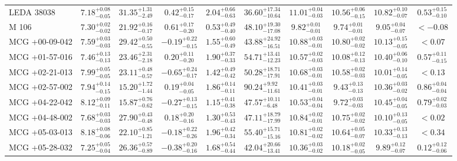 \documentclass[onecolumn]{mn2e}
\begin{document}
\begin{landscape}
{\begin{center}
\begin{longtable}{lccccccccc}
LEDA 38038 & $7.18_{-0.05}^{+0.08}$ & $31.35_{-2.49}^{+1.31}$ & $0.42_{-0.17}^{+0.15}$ & $2.04_{-0.63}^{+0.66}$ &$36.60_{-10.64}^{+17.34}$ & $11.01_{-0.03}^{+0.04}$ & $10.56_{-0.15}^{+0.06}$ & $10.82_{-0.07}^{+0.10}$ & $0.53_{-0.10}^{+0.15}$ \\
M 106 & $7.30_{-0.02}^{+0.02}$ & $21.92_{-0.17}^{+0.16}$ & $0.61_{-0.20}^{+0.17}$ & $0.53_{-0.40}^{+0.49}$ &$48.10_{-17.08}^{+19.30}$ & $9.82_{-0.01}^{+0.01}$ & $9.74_{-0.01}^{+0.01}$ & $9.05_{-0.07}^{+0.04}$ & $<-0.08$ \\
MCG +00-09-042 & $7.59_{-0.03}^{+0.03}$ & $29.42_{-0.55}^{+0.50}$ & $-0.19_{-0.15}^{+0.22}$ & $1.55_{-0.49}^{+0.60}$ &$43.88_{-16.51}^{+24.92}$ & $10.88_{-0.01}^{+0.03}$ & $10.80_{-0.02}^{+0.02}$ & $10.13_{-0.05}^{+0.15}$ & $<0.07$ \\
MCG +01-57-016 & $7.46_{-0.13}^{+0.13}$ & $23.46_{-2.18}^{+2.31}$ & $0.20_{-0.20}^{+0.11}$ & $1.90_{-0.33}^{+0.37}$ &$54.71_{-12.23}^{+13.41}$ & $10.57_{-0.03}^{+0.02}$ & $10.08_{-0.13}^{+0.12}$ & $10.40_{-0.10}^{+0.06}$ & $0.57_{-0.15}^{+0.11}$ \\
MCG +02-21-013 & $7.99_{-0.05}^{+0.05}$ & $23.11_{-0.57}^{+0.48}$ & $-0.65_{-0.17}^{+0.24}$ & $1.42_{-0.42}^{+0.49}$ &$50.28_{-17.91}^{+18.71}$ & $10.68_{-0.01}^{+0.03}$ & $10.58_{-0.03}^{+0.02}$ & $10.01_{-0.05}^{+0.14}$ & $<0.13$ \\
MCG +02-57-002 & $7.94_{-0.15}^{+0.14}$ & $15.20_{-1.44}^{+1.72}$ & $0.19_{-0.05}^{+0.04}$ & $1.86_{-0.11}^{+0.14}$ &$90.24_{-11.61}^{+9.92}$ & $10.41_{-0.01}^{+0.03}$ & $9.43_{-0.13}^{+0.13}$ & $10.36_{-0.02}^{+0.03}$ & $0.86_{-0.04}^{+0.04}$ \\
MCG +04-22-042 & $8.12_{-0.11}^{+0.09}$ & $15.87_{-0.62}^{+0.76}$ & $-0.27_{-0.15}^{+0.13}$ & $1.15_{-0.38}^{+0.41}$ &$47.57_{-6.48}^{+10.11}$ & $10.53_{-0.04}^{+0.04}$ & $9.72_{-0.03}^{+0.03}$ & $10.45_{-0.05}^{+0.04}$ & $0.79_{-0.03}^{+0.02}$ \\
MCG +04-48-002 & $7.68_{-0.03}^{+0.03}$ & $27.90_{-0.48}^{+0.43}$ & $0.18_{-0.16}^{+0.20}$ & $1.30_{-0.43}^{+0.53}$ &$47.11_{-17.99}^{+18.79}$ & $10.84_{-0.01}^{+0.02}$ & $10.75_{-0.02}^{+0.02}$ & $10.10_{-0.05}^{+0.13}$ & $<0.02$ \\
MCG +05-03-013 & $8.18_{-0.06}^{+0.08}$ & $22.10_{-1.21}^{+0.85}$ & $-0.18_{-0.26}^{+0.22}$ & $1.96_{-0.34}^{+0.42}$ &$55.40_{-15.16}^{+15.71}$ & $10.81_{-0.02}^{+0.02}$ & $10.64_{-0.07}^{+0.05}$ & $10.33_{-0.13}^{+0.13}$ & $<0.34$ \\
MCG +05-28-032 & $7.25_{-0.04}^{+0.05}$ & $26.36_{-0.89}^{+0.57}$ & $-0.38_{-0.16}^{+0.20}$ & $1.68_{-0.44}^{+0.54}$ &$42.04_{-13.41}^{+20.66}$ & $10.36_{-0.02}^{+0.03}$ & $10.18_{-0.05}^{+0.02}$ & $9.89_{-0.07}^{+0.12}$ & $0.12_{-0.06}^{+0.12}$ \\

\end{longtable}
\end{center}}
\end{landscape}
\end{document}
